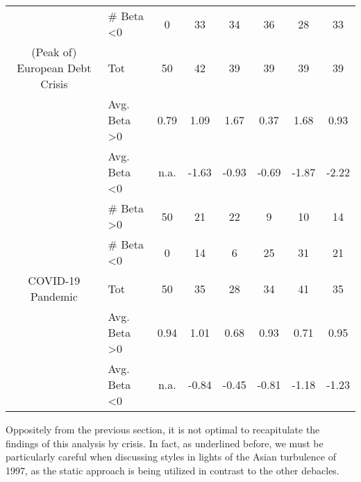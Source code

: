 \documentclass[12pt]{article}
\begin{document}
\begin{table}[]
{\begin{tabular}{@{}clcccccc@{}}
                               & \# Beta \textless 0      & 0               & 33                 & 34            & 36                & 28                      & 33               \\
(Peak of) European Debt Crisis & Tot                      & 50              & 42                 & 39            & 39                & 39                      & 39               \\
                               & Avg. Beta \textgreater 0 & 0.79            & 1.09               & 1.67          & 0.37              & 1.68                    & 0.93             \\
                               & Avg. Beta \textless 0    & n.a.            & -1.63              & -0.93         & -0.69             & -1.87                   & -2.22            \\ \midrule
                               & \# Beta \textgreater 0   & 50              & 21                 & 22            & 9                 & 10                      & 14               \\
                               & \# Beta \textless 0      & 0               & 14                 & 6             & 25                & 31                      & 21               \\
COVID-19 Pandemic              & Tot                      & 50              & 35                 & 28            & 34                & 41                      & 35               \\
\multicolumn{1}{l}{}           & Avg. Beta \textgreater 0 & 0.94            & 1.01               & 0.68          & 0.93              & 0.71                    & 0.95             \\
\multicolumn{1}{l}{}           & Avg. Beta \textless 0    & n.a.            & -0.84              & -0.45         & -0.81             & -1.18                   & -1.23            \\ \bottomrule
\end{tabular}}
\end{table}

Oppositely from the previous section, it is not optimal to recapitulate the findings of this analysis by crisis. In fact, as underlined before, we must be particularly careful when discussing styles in lights of the Asian turbulence of 1997, as the static approach is being utilized in contrast to the other debacles.
\end{document}
